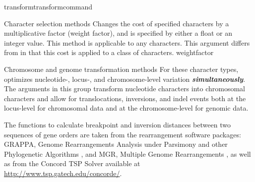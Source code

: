 \begin{command}{transform}{transformcommand}
\begin{arguments}
\begin{argumentgroup}{Character selection methods}
                {Changes the cost of specified characters by a multiplicative factor (weight factor), 
                and is specified by either a float or an integer value. This method is applicable to any characters.
                This argument differs from  in that this cost is applied to a class
                of characters.} 
                {weightfactor}

        \end{argumentgroup}
     



        \begin{argumentgroup}{Chromosome and genome transformation methods}
            For these character types, \poy optimizes nucleotide-, 
            locus-, and chromosome-level variation {\bf \emph{simultaneously}}. The arguments in this group
            transform nucleotide characters into chromosomal characters and allow for 
            translocations, inversions, and indel events both at the locus-level for chromosomal data 
            and at the chromosome-level for genomic data.
       
            \indent The functions to calculate breakpoint and inversion distances between
            two sequences of gene orders are taken from the rearrangement software
            packages: GRAPPA, Genome Rearrangements Analysis under Parsimony and
            other Phylogenetic Algorithms \cite{baderetal2002}, and MGR, Multiple
            Genome Rearrangements \cite{bourqueandpevzner2002}, as well as from
            the Concord TSP Solver available at \url{http://www.tsp.gatech.edu/concorde/}.


\end{argumentgroup}
\end{arguments}
\end{command}
